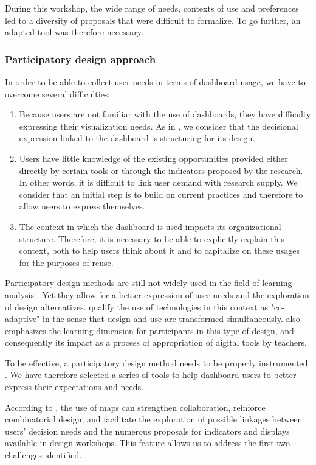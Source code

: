 \documentclass[manuscript,nonacm,12pt]{acmart}
\begin{document}
During this workshop, the wide range of needs, contexts of use and preferences led to a diversity of proposals that were difficult to formalize. To go further, an adapted tool was therefore necessary.


\subsubsection{Participatory design approach}
In order to be able to collect user needs in terms of dashboard usage, we have to overcome several difficulties:
\begin{enumerate}
    \item Because users are not familiar with the use of dashboards, they have difficulty expressing their visualization needs. As in \citet{xhakaj2017effects}, we consider that the decisional expression linked to the dashboard is structuring for its design.
    \item Users have little knowledge of the existing opportunities provided either directly by certain tools or through the indicators proposed by the research. In other words, it is difficult to link user demand with research supply. We consider that an initial step is to build on current practices and therefore to allow users to express themselves.
    \item The context in which the dashboard is used impacts its organizational structure. Therefore, it is necessary to be able to explicitly explain this context, both to help users think about it and to capitalize on these usages for the purposes of reuse.
\end{enumerate}

Participatory design methods are still not widely used in the field of learning analysis \cite{abel2013cross}. Yet they allow for a better expression of user needs and the exploration of design alternatives. \citet{mackay1997radicalement} qualify the use of technologies in this context as "co-adaptive" in the sense that design and use are transformed simultaneously. \citet{knibbe2016} also emphasizes the learning dimension for participants in this type of design, and consequently its impact as a process of appropriation of digital tools by teachers.

To be effective, a participatory design method needs to be properly instrumented \cite{sanders2010framework}. We have therefore selected a series of tools to help dashboard users to better express their expectations and needs.

According to \citet{lucero2016designing}, the use of maps can strengthen collaboration, reinforce combinatorial design, and facilitate the exploration of possible linkages between users' decision needs and the numerous proposals for indicators and displays available in design workshops. This feature allows us to address the first two challenges identified.
\end{document}

